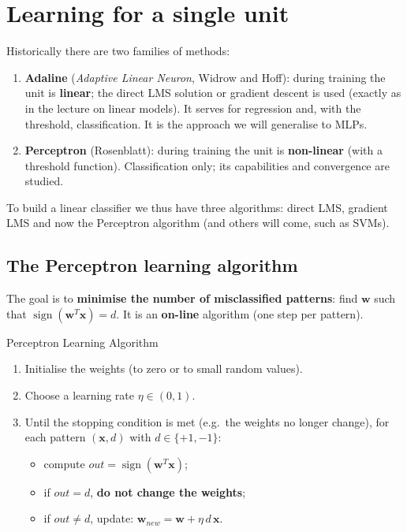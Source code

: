 \section{Learning for a single
unit}\label{apprendimento-per-una-singola-unituxe0}

Historically there are two families of methods:

\begin{enumerate}
\def\labelenumi{\arabic{enumi}.}
\tightlist
\item
  \textbf{Adaline} (\emph{Adaptive Linear Neuron}, Widrow and Hoff):
  during training the unit is \textbf{linear}; the direct LMS solution
  or gradient descent is used (exactly as in the lecture on linear
  models). It serves for regression and, with the threshold,
  classification. It is the approach we will generalise to MLPs.
\item
  \textbf{Perceptron} (Rosenblatt): during training the unit is
  \textbf{non-linear} (with a threshold function). Classification only;
  its capabilities and convergence are studied.
\end{enumerate}

To build a linear classifier we thus have three algorithms: direct LMS,
gradient LMS and now the Perceptron algorithm (and others will come,
such as SVMs).

\subsection{The Perceptron learning
algorithm}\label{lalgoritmo-di-apprendimento-del-perceptron}

The goal is to \textbf{minimise the number of misclassified patterns}:
find \(\mathbf{w}\) such that
\(\operatorname{sign}(\mathbf{w}^T\mathbf{x}) = d\). It is an
\textbf{on-line} algorithm (one step per pattern).

\begin{boxabstract}{Perceptron Learning Algorithm}

\begin{enumerate}
\def\labelenumi{\arabic{enumi}.}
\tightlist
\item
  Initialise the weights (to zero or to small random values).
\item
  Choose a learning rate \(\eta \in (0, 1)\).
\item
  Until the stopping condition is met (e.g.\ the weights no longer
  change), for each pattern \((\mathbf{x}, d)\) with
  \(d \in \{+1, -1\}\):

  \begin{itemize}
  \tightlist
  \item
    compute \(out = \operatorname{sign}(\mathbf{w}^T\mathbf{x})\);
  \item
    if \(out = d\), \textbf{do not change the weights};
  \item
    if \(out \ne d\), update:
    \(\mathbf{w}_{new} = \mathbf{w} + \eta\, d\, \mathbf{x}\).
  \end{itemize}
\end{enumerate}

\end{boxabstract}

